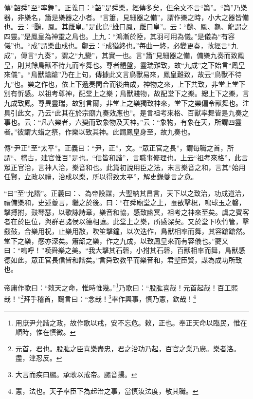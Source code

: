 {\noindent\zhuan{}\fzbyks 傳“韶舜”至“率舞”。正義曰：“韶”是舜樂，經傳多矣，但余文不言“簫”。“簫”乃樂器，非樂名，簫是樂器之小者。“言簫，見細器之備”，謂作樂之時，小大之器皆備也。云：“鶠，鳳。其雌皇。”是此鳥“雄曰鳳，雌曰皇”。云：“麟、鳳、龜、龍謂之四靈。”是鳳皇為神靈之鳥也。上九：“鴻漸於陸，其羽可用為儀。”是儀為“有容儀”也。“成”謂樂曲成也。鄭云：“成猶終也。”每曲一終，必變更奏，故經言“九成”，傳言“九奏”，謂之“九變”，其實一也。言“簫”見細器之備，備樂九奏而致鳳皇，則其餘鳥獸不待九而率舞也。尊者體盤，靈瑞難致，故“九成”之下始言“鳳皇來儀”。“鳥獸蹌蹌”乃在上句，傳據此文言鳥獸易來，鳳皇難致，故云“鳥獸不待九”也。樂之作也，依上下遞奏間合而後曲成，神物之來，上下共致，非堂上堂下別有忻感。以祖考尊神，配堂上之樂；鳥獸賤物，故配堂下之樂。總上下之樂，言九成致鳳。尊異靈瑞，故別言爾，非堂上之樂獨致神來，堂下之樂偏令獸舞也。注具引此文，乃云“此其在於宗廟九奏效應也”。是言祖考來格、百獸率舞皆是九奏之事也。云：“凡六樂者，六變而致象物及天神。”云：“象物，有象在天，所謂四靈者。”彼謂大蜡之祭，作樂以致其神。此謂鳳皇身至，故九奏也。 \par}

{\noindent\zhuan{}\fzbyks 傳“尹正”至“太平”。正義曰：“尹，正”，文。“眾正官之長”，謂每職之首，所謂“、稽古，建官惟百”是也。“信皆和諧”，言職事修理也。上云“祖考來格”，此言眾正官治，言神人洽，樂音和也。此篇初說用臣之法，末言樂音之和，言其“始用任賢，立政以禮，治成以樂，所以得致太平”，解史錄夔言之意。 \par}

{\noindent\shu{}\fzkt “曰”至“允諧”。正義曰：、為帝設謀，大聖納其昌言，天下以之致治，功成道洽，禮備樂和，史述夔言，繼之於後。曰：“在舜廟堂之上，戛敔擊柷，鳴球玉之磬，擊搏拊，鼓琴瑟，以歌詠詩章，樂音和協，感致幽冥，祖考之神來至矣。虞之賓客者在於臣位，與群君諸侯以德相讓。此堂上之樂，所感深矣。又於堂下吹竹管，擊鼗鼓，合樂用柷，止樂用敔，吹笙擊鐘，以次迭作，鳥獸相率而舞，其容蹌蹌然。堂下之樂，感亦深矣。簫韶之樂，作之九成，以致鳳皇來而有容儀也。”夔又曰：“嗚呼！”嘆舜樂之美。“我大擊其石磬，小拊其石磬，百獸相率而舞，鳥獸感德如此，眾正官長信皆和諧矣。”言舜致教平而樂音和，君聖臣賢，謀為成功所致也。 \par}

帝庸作歌曰：“敕天之命，惟時惟幾。”\footnote{用庶尹允諧之政，故作歌以戒，安不忘危。敕，正也。奉正天命以臨民，惟在順時，惟在慎微。}乃歌曰：“股肱喜哉！元首起哉！百工熙哉！”\footnote{元首，君也。股肱之臣喜樂盡忠，君之治功乃起，百官之業乃廣。樂者洛。盡，津忍反。}拜手稽首，颺言曰：“念哉！\footnote{大言而疾曰颺。承歌以戒帝。颺音揚。}率作興事，慎乃憲，欽哉！\footnote{憲，法也。天子率臣下為起治之事，當慎汝法度，敬其職。}


